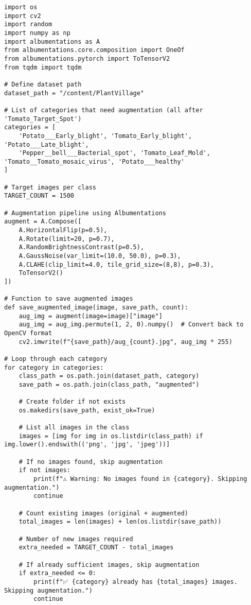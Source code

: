 \documentclass{article}
\begin{document}
\begin{lstlisting}
import os
import cv2
import random
import numpy as np
import albumentations as A
from albumentations.core.composition import OneOf
from albumentations.pytorch import ToTensorV2
from tqdm import tqdm

# Define dataset path
dataset_path = "/content/PlantVillage"

# List of categories that need augmentation (all after 'Tomato_Target_Spot')
categories = [
    'Potato___Early_blight', 'Tomato_Early_blight', 'Potato___Late_blight',
    'Pepper__bell___Bacterial_spot', 'Tomato_Leaf_Mold', 'Tomato__Tomato_mosaic_virus', 'Potato___healthy'
]

# Target images per class
TARGET_COUNT = 1500

# Augmentation pipeline using Albumentations
augment = A.Compose([
    A.HorizontalFlip(p=0.5),
    A.Rotate(limit=20, p=0.7),
    A.RandomBrightnessContrast(p=0.5),
    A.GaussNoise(var_limit=(10.0, 50.0), p=0.3),
    A.CLAHE(clip_limit=4.0, tile_grid_size=(8,8), p=0.3),
    ToTensorV2()
])

# Function to save augmented images
def save_augmented_image(image, save_path, count):
    aug_img = augment(image=image)["image"]
    aug_img = aug_img.permute(1, 2, 0).numpy()  # Convert back to OpenCV format
    cv2.imwrite(f"{save_path}/aug_{count}.jpg", aug_img * 255)

# Loop through each category
for category in categories:
    class_path = os.path.join(dataset_path, category)
    save_path = os.path.join(class_path, "augmented")

    # Create folder if not exists
    os.makedirs(save_path, exist_ok=True)

    # List all images in the class
    images = [img for img in os.listdir(class_path) if img.lower().endswith(('png', 'jpg', 'jpeg'))]

    # If no images found, skip augmentation
    if not images:
        print(f"⚠️ Warning: No images found in {category}. Skipping augmentation.")
        continue

    # Count existing images (original + augmented)
    total_images = len(images) + len(os.listdir(save_path))

    # Number of new images required
    extra_needed = TARGET_COUNT - total_images

    # If already sufficient images, skip augmentation
    if extra_needed <= 0:
        print(f"✅ {category} already has {total_images} images. Skipping augmentation.")
        continue


\end{lstlisting}
\end{document}
